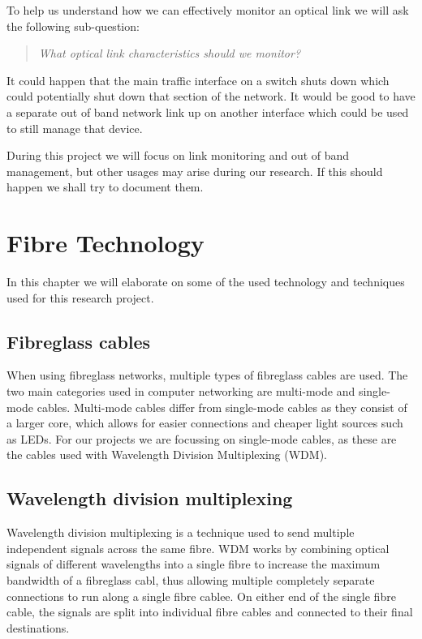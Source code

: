 \documentclass{article}
\begin{document}
To help us understand how we can effectively monitor an optical link we will ask the following sub-question:
\begin{quote}
\textit{
What optical link characteristics should we monitor?
}
\end{quote}

It could happen that the main traffic interface on a switch shuts down which could potentially shut down that section of the network.
It would be good to have a separate out of band network link up on another interface which could be used to still manage that device.

During this project we will focus on link monitoring and out of band management, but other usages may arise during our research.
If this should happen we shall try to document them.

\newpage
\section{Fibre Technology}
In this chapter we will elaborate on some of the used technology and techniques used for this research project.
\subsection{Fibreglass cables}
When using fibreglass networks, multiple types of fibreglass cables are used.
The two main categories used in computer networking are multi-mode and single-mode cables.
Multi-mode cables differ from single-mode cables as they consist of a larger core, which allows for easier connections and cheaper light sources such as LEDs. \cite{Fundamentals:2008}
For our projects we are focussing on single-mode cables, as these are the cables used with Wavelength Division Multiplexing (WDM).

\subsection{Wavelength division multiplexing}
Wavelength division multiplexing is a technique used to send multiple independent signals across the same fibre.
WDM works by combining optical signals of different wavelengths into a single fibre to increase the maximum bandwidth of a fibreglass cabl, thus allowing multiple completely separate connections to run along a single fibre cablee.
On either end of the single fibre cable, the signals are split into individual fibre cables and connected to their final destinations.
\end{document}
